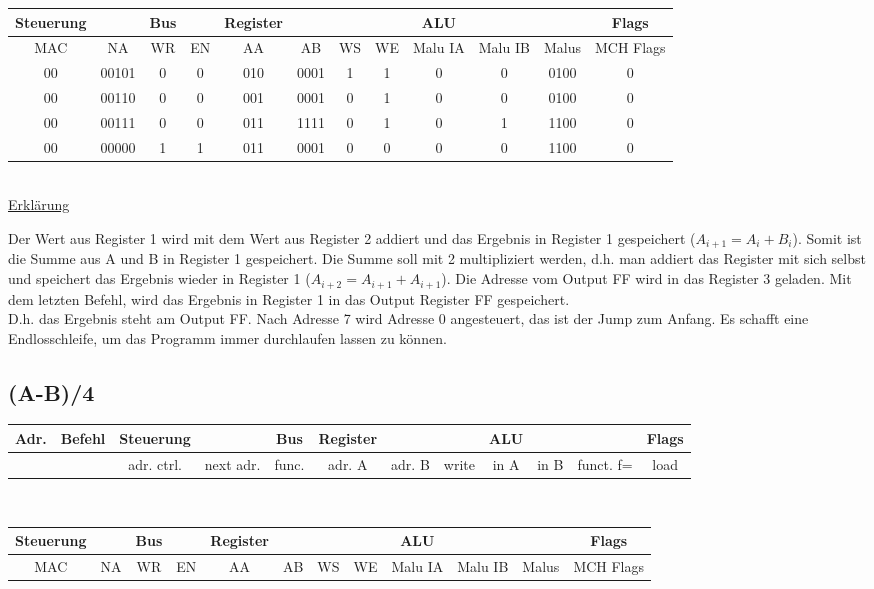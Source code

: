\documentclass[paper=a4, fontsize=11pt]{scrartcl}
\numberwithin{equation}{section}
\numberwithin{figure}{section}
\numberwithin{table}{section}
\begin{document}
\begin{tabular}{|cc|cc|cccc|ccc|c|}
\hline
Steuerung & & Bus & & Register & & & & ALU & & & Flags \\
\hline
MAC & NA & WR & EN & AA & AB & WS & WE & Malu IA & Malu IB & Malus & MCH Flags \\
\hline
00 & 00101 & 0 & 0 & 010 & 0001 & 1 & 1 & 0 & 0 & 0100 & 0 \\
\hline
00 & 00110 & 0 & 0 & 001 & 0001 & 0 & 1 & 0 & 0 & 0100 & 0 \\
\hline
00 & 00111 & 0 & 0 & 011 & 1111 & 0 & 1 & 0 & 1 & 1100 & 0 \\
\hline
00 & 00000 & 1 & 1 & 011 & 0001 & 0 & 0 & 0 & 0 & 1100 & 0 \\
\hline
\end{tabular} \\

\underline{Erklärung}

Der Wert aus Register 1 wird mit dem Wert aus Register 2 addiert und das Ergebnis in Register 1 gespeichert ($A_{i+1}=A_{i}+B_{i}$). Somit ist die Summe aus A und B in Register 1 gespeichert. Die Summe soll mit 2 multipliziert werden, d.h. man addiert das Register mit sich selbst und speichert das Ergebnis wieder in Register 1 ($A_{i+2}=A_{i+1}+A_{i+1}$). Die Adresse vom Output FF wird in das Register 3 geladen. Mit dem letzten Befehl, wird das Ergebnis in Register 1 in das Output Register FF gespeichert. \\
D.h. das Ergebnis steht am Output FF. Nach Adresse 7 wird Adresse 0 angesteuert, das ist der Jump zum Anfang. Es schafft eine Endlosschleife, um das Programm immer durchlaufen lassen zu können.


\subsection{(A-B)/4}

\begin{tabular}{|c|c|cc|c|ccc|ccc|c|}
\hline
Adr. & Befehl &Steuerung & & Bus & Register & & & ALU & & & Flags \\
\hline
& & adr. ctrl. & next adr. & func. & adr. A & adr. B & write & in A & in B & funct. f= & load \\
\hline
\end{tabular} \\

\begin{tabular}{|cc|cc|cccc|ccc|c|}
\hline
Steuerung & & Bus & & Register & & & & ALU & & & Flags \\
\hline
MAC & NA & WR & EN & AA & AB & WS & WE & Malu IA & Malu IB & Malus & MCH Flags \\
\hline
\end{tabular} \\
\end{document}
